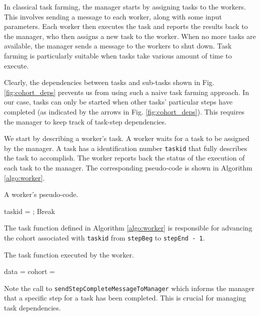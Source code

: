 \documentclass[a4paper,oneside,12pt]{article}
\begin{document}
In classical task farming, the manager starts by assigning tasks to the workers. This involves sending a message to each worker, along with 
some input parameters. Each worker then executes the task and reports the results back to the manager, who then assigns a new task to the worker. 
When no more tasks are available, the manager sends a message to the workers to shut down. Task farming is particularly suitable when tasks 
take various amount of time to execute.

Clearly, the dependencies between tasks and sub-tasks shown in Fig. \ref{fig:cohort_deps} prevents us from using such a naive task farming approach. 
In our case, tasks can only be started when other tasks' particular steps have completed
(as indicated by the arrows in Fig. \ref{fig:cohort_deps}). This requires the manager to keep track of task-step dependencies.

We start by describing a worker's task. A worker waits for a task to be assigned by the manager. A task has a identification number \verb|taskid| 
that fully describes the task to accomplish. The worker reports back the status of the execution of each task to the manager. 
The corresponding pseudo-code is shown in Algorithm \ref{algo:worker}.

\begin{algorithm}
\caption{A worker's pseudo-code.}
    \begin{algorithmic}[1] %

        taskid = ;
            Break
        \EndIf

        \State {}

        \State {}
    
    \EndWhile
\end{algorithmic}
\label{algo:worker}
\end{algorithm}

The task function defined in Algorithm \ref{algo:worker} is responsible for advancing the cohort associated with \verb|taskid| from \verb|stepBeg| to \verb|stepEnd - 1|.
\begin{algorithm}
\caption{The task function executed by the worker.}
    \begin{algorithmic}[1] %
    \State data = 
    \State cohort = 
        \State {}
        \State {}
    \EndFor
\EndFunction
\end{algorithmic}
\label{algo:worker}
\end{algorithm}
Note the call to \verb|sendStepCompleteMessageToManager| which informs the manager that a specific step for a task has been completed. 
This is crucial for managing task dependencies.
\end{document}
